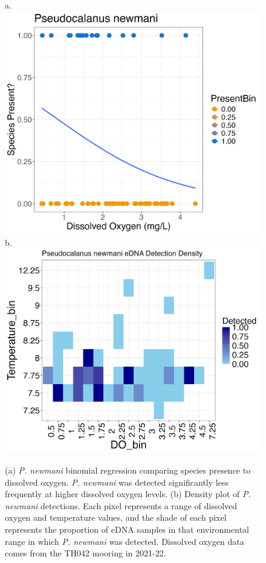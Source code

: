 \documentclass[12pt,twoside]{reedthesis}
\begin{document}
	\begin{figure}[!h]
		\begin{center}
			a. \includegraphics[scale=0.3]{Pnewmani_binom_sig_neg}
			b. \includegraphics[scale=0.3]{Pnewmani_Density} \\
			\caption[\textit{P. newmani} binomial regressions]{\footnotesize{(a) \textit{P. newmani} binomial regression comparing species presence to dissolved oxygen. \textit{P. newmani} was detected significantly less frequently at higher dissolved oxygen levels. (b) Density plot of \textit{P. newmani} detections. Each pixel represents a range of dissolved oxygen and temperature values, and the shade of each pixel represents the proportion of eDNA samples in that environmental range in which \textit{P. newmani} was detected. Dissolved oxygen data comes from the TH042 mooring in 2021-22.}} %
			\label{PnewmaniBinomDensity}
		\end{center}
	\end{figure} 
	
\end{document}
